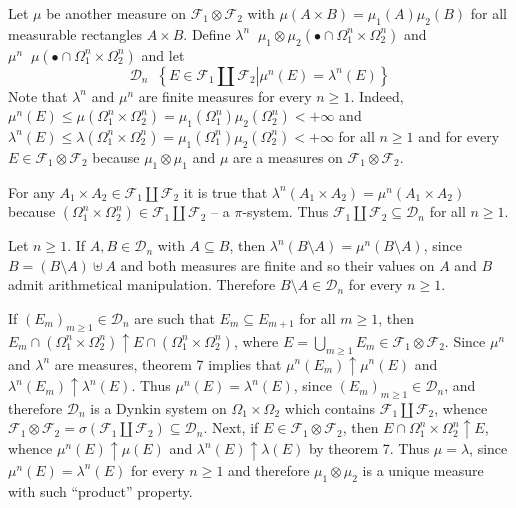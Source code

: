 \documentclass[a4paper]{article}
\newcommand{\obj}[1]{\left\{ #1 \right \}}
\newcommand{\brac}[1]{\left ( #1 \right )}
\newcommand{\induc}[1]{\left . #1 \right \vert}
\newcommand{\Dcal}{\mathcal{D}}
\newcommand{\Fcal}{\mathcal{F}}
\newcommand{\defn}{\mathop{\overset{\Delta}{=}}\nolimits}
\begin{document}
Let $\mu$ be another measure on $\Fcal_1\otimes\Fcal_2$ with $\mu\brac{A\times B} = \mu_1\brac{A}\mu_2\brac{B}$ for all measurable rectangles $A\times B$. Define $\lambda^n\defn \mu_1\otimes \mu_2\brac{ \bullet \cap \Omega_1^n\times\Omega_2^n }$ and $\mu^n \defn \mu\brac{\bullet \cap  \Omega_1^n\times\Omega_2^n }$ and let \[\Dcal_n \defn \obj{ \induc{ E\in \Fcal_1\coprod \Fcal_2 } \mu^n\brac{E} = \lambda^n\brac{E} }\] Note that $\lambda^n$ and $\mu^n$ are finite measures for every $n\geq 1$. Indeed, $\mu^n\brac{E}\leq \mu\brac{\Omega_1^n \times \Omega_2^n} = \mu_1\brac{\Omega_1^n}\mu_2\brac{\Omega_2^n} < +\infty$ and $\lambda^n\brac{E}\leq \lambda\brac{\Omega_1^n \times \Omega_2^n} = \mu_1\brac{\Omega_1^n}\mu_2\brac{\Omega_2^n} < +\infty$ for all $n\geq 1$ and for every $E\in \Fcal_1\otimes \Fcal_2$ because $\mu_1\otimes\mu_1$ and $\mu$ are a measures on $\Fcal_1\otimes \Fcal_2$.

For any $A_1\times A_2\in \Fcal_1\coprod \Fcal_2$ it is true that $\lambda^n\brac{A_1\times A_2} = \mu^n\brac{A_1\times A_2}$ because $\brac{\Omega_1^n \times \Omega_2^n} \in \Fcal_1\coprod \Fcal_2$ -- a $\pi$-system. Thus $\Fcal_1\coprod \Fcal_2\subseteq \Dcal_n$ for all $n\geq 1$.

Let $n\geq 1$. If $A, B\in\Dcal_n$ with $A\subseteq B$, then $\lambda^n\brac{B\setminus A} = \mu^n\brac{B\setminus A}$, since $B = \brac{B\setminus A}  \uplus A$ and both measures are finite and so their values on $A$ and $B$ admit arithmetical manipulation. Therefore $B\setminus A\in \Dcal_n$ for every $n\geq 1$.

If $\brac{E_m}_{m\geq 1}\in \Dcal_n$ are such that $E_m\subseteq E_{m+1}$ for all $m\geq 1$, then $E_m\cap \brac{\Omega_1^n \times \Omega_2^n}\uparrow E\cap \brac{\Omega_1^n \times \Omega_2^n}$, where $E=\bigcup_{m\geq 1}E_m\in \Fcal_1\otimes\Fcal_2$. Since $\mu^n$ and $\lambda^n$ are measures, theorem 7 implies that $\mu^n\brac{E_m}\uparrow \mu^n\brac{E}$ and $\lambda^n\brac{E_m} \uparrow \lambda^n\brac{E}$. Thus $\mu^n\brac{E} = \lambda^n\brac{E}$, since $\brac{E_m}_{m\geq 1}\in \Dcal_n$, and therefore $\Dcal_n$ is a Dynkin system on $\Omega_1\times\Omega_2$ which contains $\Fcal_1\coprod\Fcal_2$, whence $\Fcal_1\otimes \Fcal_2 = \sigma\brac{\Fcal_1\coprod \Fcal_2}\subseteq \Dcal_n$. Next, if $E\in \Fcal_1\otimes\Fcal_2$, then $E\cap \Omega_1^n\times \Omega_2^n \uparrow E$, whence $\mu^n\brac{E}\uparrow \mu\brac{E}$ and $\lambda^n\brac{E}\uparrow \lambda\brac{E}$ by theorem 7. Thus $\mu = \lambda$, since $\mu^n\brac{E}=\lambda^n\brac{E}$ for every $n\geq 1$ and therefore $\mu_1\otimes \mu_2$ is a unique measure with such ``product'' property.
\end{document}
